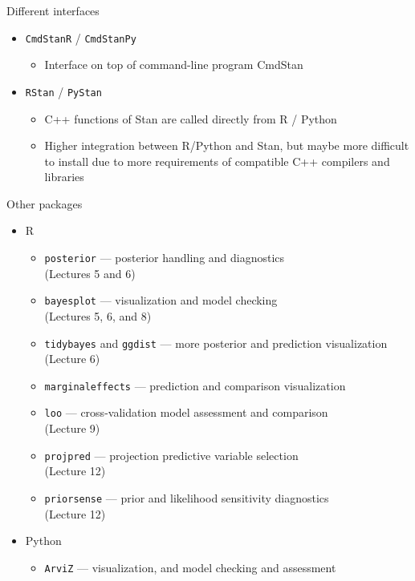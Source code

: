 \documentclass[finnish,english,t]{beamer}
\begin{document}
\begin{frame}{Different interfaces}

  \begin{itemize}
  \item \texttt{CmdStanR} / \texttt{CmdStanPy}
    \begin{itemize}
    \item Interface on top of command-line program CmdStan
    \end{itemize}
  \item \texttt{RStan} / \texttt{PyStan}
    \begin{itemize}
    \item C++ functions of Stan are called directly from R / Python
    \item Higher integration between R/Python and Stan, but maybe more
      difficult to install due to more requirements of compatible C++
      compilers and libraries
    \end{itemize}
  \end{itemize}

\end{frame} 

\begin{frame}{Other packages}

  \begin{itemize}
  \item R
    \begin{itemize}
    \item \texttt{posterior} --- posterior handling and diagnostics\\ (Lectures 5 and 6)
    \item \texttt{bayesplot} --- visualization and model checking\\ (Lectures 5, 6, and 8)
    \item \texttt{tidybayes} and \texttt{ggdist} --- more posterior and prediction visualization (Lecture 6)
    \item \texttt{marginaleffects} --- prediction and comparison visualization
    \item \texttt{loo} --- cross-validation model assessment and comparison\\ (Lecture 9)
    \item \texttt{projpred} --- projection predictive variable selection\\ (Lecture 12)
    \item \texttt{priorsense} --- prior and likelihood sensitivity
      diagnostics\\ (Lecture 12)
    \end{itemize}
    \vspace{\baselineskip}
  \item Python
    \begin{itemize}
    \item \texttt{ArviZ} --- visualization, and model checking and assessment
    \end{itemize}
  \end{itemize}

\end{frame} 
\end{document}
